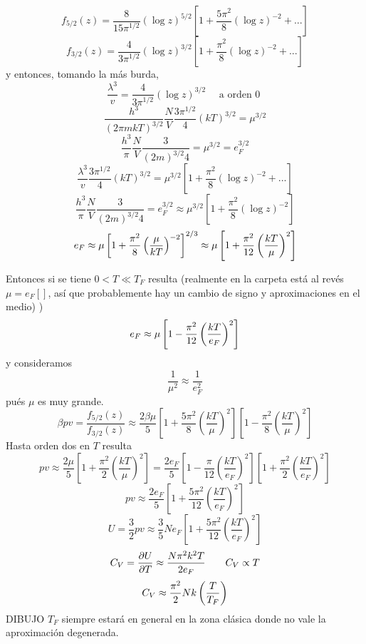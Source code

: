 \documentclass[10pt,oneside]{CBFT_book}
\begin{document}
\begin{itemize}
 \[
	f_{5/2}(z) = \frac{8}{15\pi^{1/2}} (\log z)^{5/2} \left[ 1 + \frac{5\pi^2}{8}(\log z)^{-2} + ... \right]
 \]
 \[
	f_{3/2}(z) = \frac{4}{3\pi^{1/2}} (\log z)^{3/2} \left[ 1 + \frac{\pi^2}{8}(\log z)^{-2} + ... \right]
 \]
 y entonces, tomando la más burda,
 \[
	\frac{\lambda^3}{v} = \frac{4}{3\pi^{1/2}} (\log z)^{3/2}  \quad \text{ a orden 0 }
 \]
 \[
	\frac{h^3}{ (2\pi mkT)^{3/2} } \frac{N}{V} \frac{3\pi^{1/2}}{4} (kT)^{3/2} = \mu^{ 3/2 }
 \]
 \[
	\frac{ h^3 }{ \pi } \frac{ N }{ V } \frac{ 3 }{ ( 2m )^{ 3/2 } 4 } = \mu^{ 3/2 } = e_F^{3/2}
 \]
 \[
	\frac{\lambda^3}{v}\frac{3\pi^{1/2}}{4} (kT)^{3/2} = 
	\mu^{3/2}\left[ 1 + \frac{\pi^2}{8}(\log z)^{-2} + ... \right]
 \]
 \[
	\frac{ h^3 }{ \pi } \frac{ N }{ V } \frac{ 3 }{ ( 2m )^{ 3/2 } 4 } = e_F^{3/2} \approx
	\mu^{3/2} \left[ 1 + \frac{\pi^2}{8}(\log z)^{-2} \right]
 \]
 \[
	e_F \approx \mu \left[ 1 + \frac{\pi^2}{8} \left( \frac{  \mu  }{  kT  } \right)^{-2} \right]^{ 2/3 } \approx 
	\mu \left[ 1 + \frac{\pi^2}{12} \left( \frac{  kT  }{  \mu  } \right)^{2} \right]
 \]
 
 Entonces si se tiene $0 < T \ll T_F$ resulta (realmente en la carpeta está al revés $\mu = e_F[]$, así
 que probablemente hay un cambio de signo y aproximaciones en el medio)
 )
 \[
	e_F \approx \mu \left[ 1 - \frac{\pi^2}{12}\left( \frac{  kT  }{  e_F  } \right)^2 \right]
 \]
 y consideramos
 \[
	\frac{1}{\mu^2} \approx \frac{1}{e_F^2}
 \]
 pués $ \mu $ es muy grande.
 \[
	\beta p v = \frac{ f_{5/2}(z) }{ f_{3/2}(z) } \approx \frac{ 2 \beta \mu }{ 5 } 
	\left[ 1 + \frac{ 5\pi^2 }{ 8 } \left( \frac{kT}{\mu} \right)^2 \right]
	\left[ 1 - \frac{ \pi^2 }{ 8 } \left( \frac{kT}{\mu} \right)^2 \right]
 \]
 Hasta orden dos en $ T $ resulta 
 \[
	pv \approx \frac{ 2 \mu }{ 5 } \left[ 1 + \frac{ \pi^2 }{ 2 } \left( \frac{kT}{\mu} \right)^2 \right] =
	\frac{ 2 e_F }{ 5 }\left[ 1 - \frac{ \pi }{ 12 } \left( \frac{kT}{e_F} \right)^2 \right] 
	\left[ 1 + \frac{ \pi^2 }{ 2 } \left( \frac{kT}{e_F} \right)^2 \right] 
 \]
 \[
	pv \approx \frac{ 2 e_F }{ 5 } \left[ 1 + \frac{ 5 \pi^2 }{ 12 } \left( \frac{kT}{e_F} \right)^2 \right] 
 \]
 \[
	U = \frac{3}{2} p v \approx \frac{3}{5} N e_F 
	\left[ 1 + \frac{ 5 \pi^2 }{ 12 } \left( \frac{kT}{e_F} \right)^2 \right] 
 \]
 \[
	C_V = \frac{\partial^{\hspace{-0.05em}} {U}}{\partial {T}^{\hspace{-0.05em}}} \approx \frac{ N \pi^2 k^2 T }{ 2e_F } \qquad C_V \propto T
 \]
 \[
	C_V \approx \frac{\pi^2}{2} Nk \left( \frac{ T }{ T_F } \right)
 \]
 DIBUJO 
 $T_F$ siempre estará en general en la zona clásica donde no vale la aproximación degenerada.
 

\end{itemize}
\end{document}
